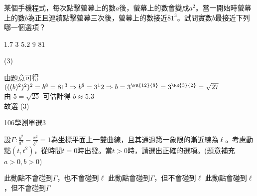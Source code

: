 \begin{QUESTIONS}
\begin{QUESTION}
\begin{ExamAnsRateInfo}{51}{84}{52}{17}
        \end{ExamAnsRateInfo}
        \begin{QBODY}
            某個手機程式，每次點擊螢幕上的數$a$後，螢幕上的數會變成${{a}^{2}}$。當一開始時螢幕上的數$b$為正且連續點擊螢幕三次後，螢幕上的數接近${{81}^{3}}$。試問實數$b$最接近下列哪一個選項？
			\begin{QOPS}
				\QOP $1.7$      
				\QOP $3$      
				\QOP $5.2$      
				\QOP $9$      
				\QOP $81$
			\end{QOPS}
        \end{QBODY}
        \begin{QFROMS}
        \end{QFROMS}
        \begin{QTAGS}\end{QTAGS}
        \begin{QANS}
            (3)
        \end{QANS}
        \begin{QSOLLIST}
            \begin{QSOL}
                由題意可得 $(((b)^2)^2)^2 = b^8 = 81^3 \Rightarrow b^8 = 3^12 \Rightarrow b=3^{\FR{12}{8}} = 3^{\FR{3}{2}} = \sqrt{27} $ \\
                由 $5=\sqrt{25}$ 可估計得 $b \approx 5.3$ \\
                故選 (3)
            \end{QSOL}
        \end{QSOLLIST}
        \begin{QEMPTYSPACE}
        \end{QEMPTYSPACE}
    \end{QUESTION}
    \begin{QUESTION}
        \begin{ExamInfo}{106}{學測}{單選}{3}
        \end{ExamInfo}
        \begin{ExamAnsRateInfo}{38}{71}{34}{9}
        \end{ExamAnsRateInfo}
        \begin{QBODY}
            設$\Gamma :\frac{{{y}^{2}}}{{{a}^{2}}}-\frac{{{x}^{2}}}{{{b}^{2}}}=1$為坐標平面上一雙曲線，且其通過第一象限的漸近線為$\ell $。考慮動點$(t,{{t}^{2}})$，從時間$t=0$時出發。當$t>0$時，請選出正確的選項。(題意補充 $a>0,b>0$)
			\begin{QOPS}
			\QOP 此動點不會碰到$\Gamma $，也不會碰到$\ell $
			\QOP 此動點會碰到$\Gamma $，但不會碰到$\ell $
			\QOP 此動點會碰到$\ell $，但不會碰到$\Gamma $

\end{QOPS}
\end{QBODY}
\end{QUESTION}
\end{QUESTIONS}

